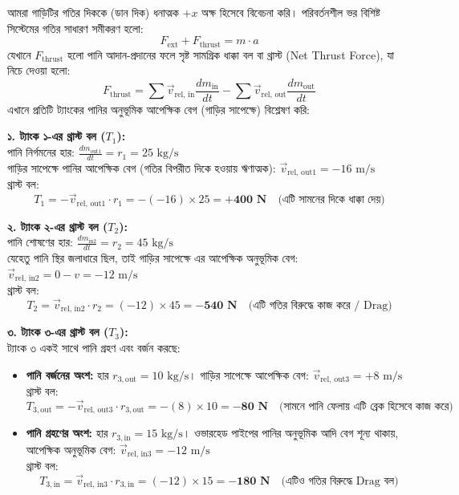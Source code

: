 \documentclass[12pt, a4paper]{article}
\begin{document}
\begin{tcolorbox}[solutionbox={সমাধান (Solution)}]
\noindent
আমরা গাড়িটির গতির দিককে (ডান দিক) ধনাত্মক $+x$ অক্ষ হিসেবে বিবেচনা করি।
পরিবর্তনশীল ভর বিশিষ্ট সিস্টেমের গতির সাধারণ সমীকরণ হলো:
$$F_{\text{ext}} + F_{\text{thrust}} = m \cdot a$$
যেখানে $F_{\text{thrust}}$ হলো পানি আদান-প্রদানের ফলে সৃষ্ট সামগ্রিক ধাক্কা বল বা থ্রাস্ট (Net Thrust Force), যা নিচে দেওয়া হলো: 
$$F_{\text{thrust}} = \sum \vec{v}_{\text{rel, in}} \frac{dm_{\text{in}}}{dt} - \sum \vec{v}_{\text{rel, out}} \frac{dm_{\text{out}}}{dt}$$
এখানে প্রতিটি ট্যাংকের পানির অনুভূমিক আপেক্ষিক বেগ (গাড়ির সাপেক্ষে) বিশ্লেষণ করি:

\vspace{0.5em}
\noindent
\textbf{১. ট্যাংক ১-এর থ্রাস্ট বল ($T_1$):} \\
পানি নির্গমনের হার: $\frac{dm_{\text{out1}}}{dt} = r_1 = 25\text{ kg/s}$ \\
গাড়ির সাপেক্ষে পানির আপেক্ষিক বেগ (গতির বিপরীত দিকে হওয়ায় ঋণাত্মক): $\vec{v}_{\text{rel, out1}} = -16\text{ m/s}$ \\
থ্রাস্ট বল: 
$$T_1 = -\vec{v}_{\text{rel, out1}} \cdot r_1 = -(-16) \times 25 = \mathbf{+400\text{ N}} \quad \text{(এটি সামনের দিকে ধাক্কা দেয়)}$$

\vspace{0.5em}
\noindent
\textbf{২. ট্যাংক ২-এর থ্রাস্ট বল ($T_2$):} \\
পানি শোষণের হার: $\frac{dm_{\text{in2}}}{dt} = r_2 = 45\text{ kg/s}$ \\
যেহেতু পানি স্থির জলাধারে ছিল, তাই গাড়ির সাপেক্ষে এর আপেক্ষিক অনুভূমিক বেগ: $\vec{v}_{\text{rel, in2}} = 0 - v = -12\text{ m/s}$ \\
থ্রাস্ট বল: 
$$T_2 = \vec{v}_{\text{rel, in2}} \cdot r_2 = (-12) \times 45 = \mathbf{-540\text{ N}} \quad \text{(এটি গতির বিরুদ্ধে কাজ করে / Drag)}$$

\vspace{0.5em}
\noindent
\textbf{৩. ট্যাংক ৩-এর থ্রাস্ট বল ($T_3$):} \\
ট্যাংক ৩ একই সাথে পানি গ্রহণ এবং বর্জন করছে:
\begin{itemize}[leftmargin=*, parsep=0.3ex]
    \item \textbf{পানি বর্জনের অংশ:} হার $r_{3,\text{out}} = 10\text{ kg/s}$। গাড়ির সাপেক্ষে আপেক্ষিক বেগ: $\vec{v}_{\text{rel, out3}} = +8\text{ m/s}$ \\
    থ্রাস্ট বল: 
    $$T_{3,\text{out}} = -\vec{v}_{\text{rel, out3}} \cdot r_{3,\text{out}} = -(8) \times 10 = \mathbf{-80\text{ N}} \quad \text{(সামনে পানি ফেলায় এটি ব্রেক হিসেবে কাজ করে)}$$
    \item \textbf{পানি গ্রহণের অংশ:} হার $r_{3,\text{in}} = 15\text{ kg/s}$। ওভারহেড পাইপের পানির অনুভূমিক আদি বেগ শূন্য থাকায়, আপেক্ষিক অনুভূমিক বেগ: $\vec{v}_{\text{rel, in3}} = -12\text{ m/s}$ \\
    থ্রাস্ট বল: 
    $$T_{3,\text{in}} = \vec{v}_{\text{rel, in3}} \cdot r_{3,\text{in}} = (-12) \times 15 = \mathbf{-180\text{ N}} \quad \text{(এটিও গতির বিরুদ্ধে Drag বল)}$$
\end{itemize}


\end{tcolorbox}
\end{document}

